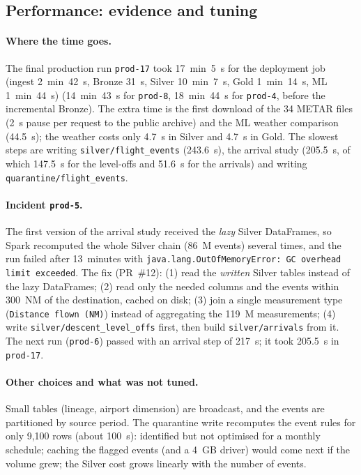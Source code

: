 \documentclass[11pt,a4paper]{article}
\begin{document}
\subsection{Performance: evidence and tuning}

\paragraph{Where the time goes.}
The final production run \texttt{prod-17} took 17~min~5~s for the deployment job (ingest 2~min~42~s, Bronze 31~s, Silver 10~min~7~s, Gold 1~min~14~s, ML 1~min~44~s) (14~min~43~s for \texttt{prod-8}, 18~min~44~s for \texttt{prod-4}, before the incremental Bronze). The extra time is the first download of the 34 METAR files (2~s pause per request to the public archive) and the ML weather comparison (44.5~s); the weather costs only 4.7~s in Silver and 4.7~s in Gold. The slowest steps are writing \texttt{silver/flight\_events} (243.6~s), the arrival study (205.5~s, of which 147.5~s for the level-offs and 51.6~s for the arrivals) and writing \texttt{quarantine/flight\_events}.

\paragraph{Incident \texttt{prod-5}.}
The first version of the arrival study received the \emph{lazy} Silver DataFrames, so Spark recomputed the whole Silver chain (86~M events) several times, and the run failed after 13~minutes with \texttt{java.lang.OutOfMemoryError: GC overhead limit exceeded}. The fix (PR~\#12): (1) read the \emph{written} Silver tables instead of the lazy DataFrames; (2) read only the needed columns and the events within 300~NM of the destination, cached on disk; (3) join a single measurement type (\texttt{Distance flown (NM)}) instead of aggregating the 119~M measurements; (4) write \texttt{silver/descent\_level\_offs} first, then build \texttt{silver/arrivals} from it.
The next run (\texttt{prod-6}) passed with an arrival step of 217~s; it took 205.5~s in \texttt{prod-17}.

\paragraph{Other choices and what was not tuned.}
Small tables (lineage, airport dimension) are broadcast, and the events are partitioned by source period. The quarantine write recomputes the event rules for only 9,100 rows (about 100~s): identified but not optimised for a monthly schedule; caching the flagged events (and a 4~GB driver) would come next if the volume grew; the Silver cost grows linearly with the number of events.
\end{document}
